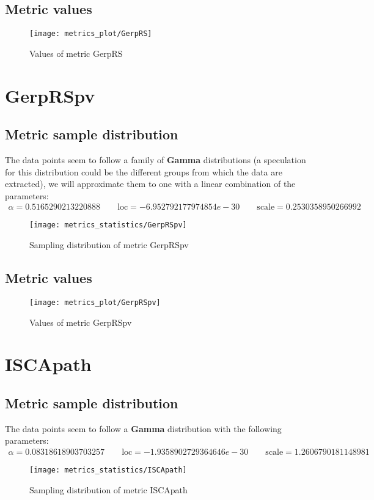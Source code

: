 \subsection{Metric values}
\begin{figure}
	\texttt{[image: metrics\_plot/GerpRS]}
	\caption{Values of metric GerpRS}
\end{figure}

\clearpage
\section{GerpRSpv}
\subsection{Metric sample distribution}
The data points seem to follow a family of \textbf{Gamma} distributions (a speculation for this distribution could be the different groups from which the data are extracted), we will approximate them to one with a linear combination of the parameters:
\begin{align*}
	\alpha   = 0.5165290213220888    \qquad  \text{loc} = -6.952792177974854e-30 \qquad \text{scale} = 0.2530358950266992
\end{align*}
\begin{figure}
	\texttt{[image: metrics\_statistics/GerpRSpv]}
	\caption{Sampling distribution of metric GerpRSpv}
\end{figure}
\subsection{Metric values}
\begin{figure}
	\texttt{[image: metrics\_plot/GerpRSpv]}
	\caption{Values of metric GerpRSpv}
\end{figure}

\clearpage
\section{ISCApath}
\subsection{Metric sample distribution}
The data points seem to follow a \textbf{Gamma} distribution with the following parameters:
\begin{align*}
	\alpha   = 0.08318618903703257    \qquad  \text{loc} = -1.9358902729364646e-30 \qquad \text{scale} = 1.2606790181148981
\end{align*}
\begin{figure}
	\texttt{[image: metrics\_statistics/ISCApath]}
	\caption{Sampling distribution of metric ISCApath}
\end{figure}

